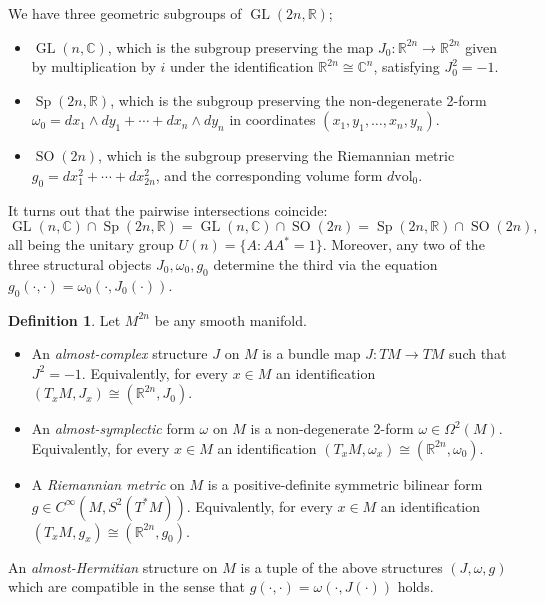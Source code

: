 \documentclass[a4paper]{article}
\theoremstyle{definition}
\newtheorem*{definition}{Definition}
\theoremstyle{remark}
\DeclareMathOperator{\Sp}{Sp}
\DeclareMathOperator{\SO}{SO}
\DeclareMathOperator{\GL}{GL}
\newcommand{\R}{\mathbb{R}}
\newcommand{\C}{\mathbb{C}}
\begin{document}
We have three geometric subgroups of $\GL(2n,\R)$;
\begin{itemize}
    \item $\GL(n,\C)$, which is the subgroup preserving the map
        $J_0:\R^{2n}\to\R^{2n}$ given by multiplication by $i$ under the
        identification $\R^{2n}\cong\C^n$, satisfying $J_0^2=-1$.

    \item $\Sp(2n,\R)$, which is the subgroup preserving the non-degenerate
        2-form $\omega_0=dx_1\wedge dy_1+\cdots+dx_n\wedge dy_n$ in coordinates
        $(x_1,y_1,\ldots,x_n,y_n)$.

    \item $\SO(2n)$, which is the subgroup preserving the Riemannian metric
        $g_0=dx_1^2+\cdots+dx_{2n}^2$, and the corresponding volume form
        $d\text{vol}_0$.
\end{itemize}
It turns out that the pairwise intersections coincide:
\begin{equation*}
    \GL(n,\C)\cap\Sp(2n,\R)
        = \GL(n,\C)\cap\SO(2n)
        = \Sp(2n,\R)\cap\SO(2n),
\end{equation*}
all being the unitary group $U(n)=\{A:AA^*=1\}$. Moreover, any two of the three
structural objects $J_0,\omega_0,g_0$ determine the third via the equation
$g_0(\cdot,\cdot)=\omega_0(\cdot,J_0(\cdot))$.

\begin{definition}
    Let $M^{2n}$ be any smooth manifold.
    \begin{itemize}
        \item An \emph{almost-complex} structure $J$ on $M$ is a bundle map
            $J:TM\to TM$ such that $J^2=-1$. Equivalently, for every $x\in M$ an
            identification $(T_xM,J_x)\cong(\R^{2n},J_0)$.

        \item An \emph{almost-symplectic} form $\omega$ on $M$ is a
            non-degenerate 2-form $\omega\in\Omega^2(M)$. Equivalently, for
            every $x\in M$ an identification
            $(T_xM,\omega_x)\cong(\R^{2n},\omega_0)$.

        \item A \emph{Riemannian metric} on $M$ is a positive-definite symmetric
            bilinear form $g\in C^\infty(M,S^2(T^*M))$. Equivalently, for every
            $x\in M$ an identification $(T_xM,g_x)\cong(\R^{2n},g_0)$.
    \end{itemize}
    An \emph{almost-Hermitian} structure on $M$ is a tuple of the above
    structures $(J,\omega,g)$ which are compatible in the sense that
    $g(\cdot,\cdot)=\omega(\cdot,J(\cdot))$ holds.
\end{definition}
\end{document}

